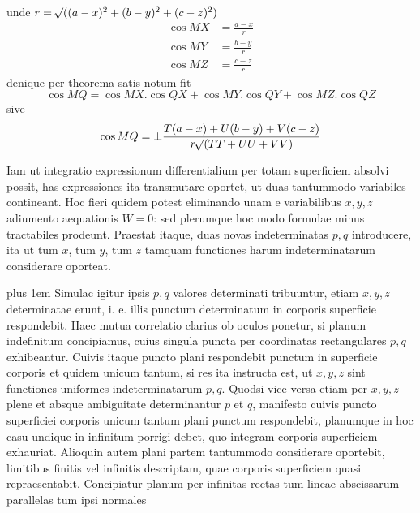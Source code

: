 unde $r=\mathord{{}^{}\!\surd}((a-x)^2+(b-y)^2+(c-z)^2)$
\[
\begin{aligned}
\cos MX&=\frac{a-x}{r}\\
\cos MY&=\frac{b-y}{r}\\
\cos MZ&=\frac{c-z}{r}
\end{aligned}
\]
denique per theorema satis notum fit
\[
\cos MQ=\cos MX.\cos QX+\cos MY.\cos QY+\cos MZ.\cos QZ
\]
sive
\[
\cos MQ=\pm\frac{T(a-x)+U(b-y)+V(c-z)}{r\mathord{{}^{}\!\surd}(TT+UU+VV)}
\]

\par
Iam ut integratio expressionum differentialium per totam superficiem absolvi possit, has expressiones ita transmutare oportet, ut duas tantummodo variabiles contineant. Hoc fieri quidem potest eliminando unam e variabilibus $x,y,z$ adiumento aequationis $W=0$: sed plerumque hoc modo formulae minus tractabiles prodeunt. Praestat itaque, duas novas indeterminatas $p,q$ introducere, ita ut tum $x$, tum $y$, tum $z$ tamquam functiones harum indeterminatarum considerare oporteat.

\begingroup\rightskip=0pt plus 1em
Simulac igitur ipsis $p,q$ valores determinati tribuuntur, etiam $x,y,z$ determinatae erunt, i. e. illis punctum determinatum in corporis superficie respondebit. Haec mutua correlatio clarius ob oculos ponetur, si planum indefinitum concipiamus, cuius singula puncta per coordinatas rectangulares $p,q$ exhibeantur. Cuivis itaque puncto plani respondebit punctum in superficie corporis et quidem unicum tantum, si res ita instructa est, ut $x,y,z$ sint functiones uniformes indeterminatarum $p,q$. Quodsi vice versa etiam per $x,y,z$ plene et absque ambiguitate determinantur $p$ et $q$, manifesto cuivis puncto superficiei corporis unicum tantum plani punctum respondebit, planumque in hoc casu undique in infinitum porrigi debet, quo integram corporis superficiem exhauriat. Alioquin autem plani partem tantummodo considerare oportebit, limitibus finitis vel infinitis descriptam, quae corporis superficiem quasi repraesentabit. Concipiatur planum per infinitas rectas tum lineae abscissarum parallelas tum ipsi normales
